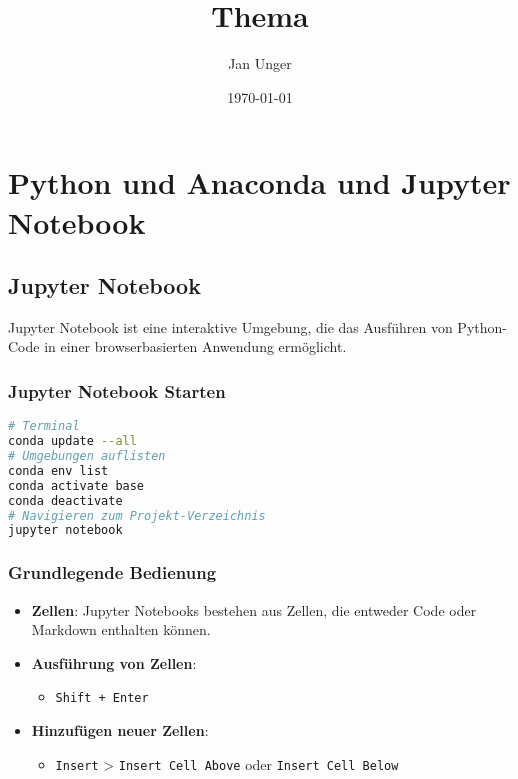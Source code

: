 \documentclass{vorlage-design-main}
\title{Thema}
\author{Jan Unger}
\date{\today}
\begin{document}
\maketitle

\begin{abstract}

\end{abstract}

\hypertarget{python-und-anaconda-und-jupyter-notebook}{%
\section{Python und Anaconda und Jupyter
Notebook}\label{python-und-anaconda-und-jupyter-notebook}}

\hypertarget{jupyter-notebook}{%
\subsection{Jupyter Notebook}\label{jupyter-notebook}}

Jupyter Notebook ist eine interaktive Umgebung, die das Ausführen von
Python-Code in einer browserbasierten Anwendung ermöglicht.

\hypertarget{jupyter-notebook-starten}{%
\subsubsection{Jupyter Notebook
Starten}\label{jupyter-notebook-starten}}

\begin{lstlisting}[language=bash]
# Terminal
conda update --all
# Umgebungen auflisten
conda env list
conda activate base
conda deactivate
# Navigieren zum Projekt-Verzeichnis
jupyter notebook
\end{lstlisting}

\hypertarget{grundlegende-bedienung}{%
\subsubsection{Grundlegende Bedienung}\label{grundlegende-bedienung}}

\begin{itemize}

\item
  \textbf{Zellen}: Jupyter Notebooks bestehen aus Zellen, die entweder
  Code oder Markdown enthalten können.
\item
  \textbf{Ausführung von Zellen}:

  \begin{itemize}
  
  \item
    \verb|Shift + Enter|
  \end{itemize}
\item
  \textbf{Hinzufügen neuer Zellen}:

  \begin{itemize}
  
  \item
    \verb|Insert| \textgreater{}
    \verb|Insert Cell Above| oder
    \verb|Insert Cell Below|
  \end{itemize}
\end{itemize}
\end{document}
